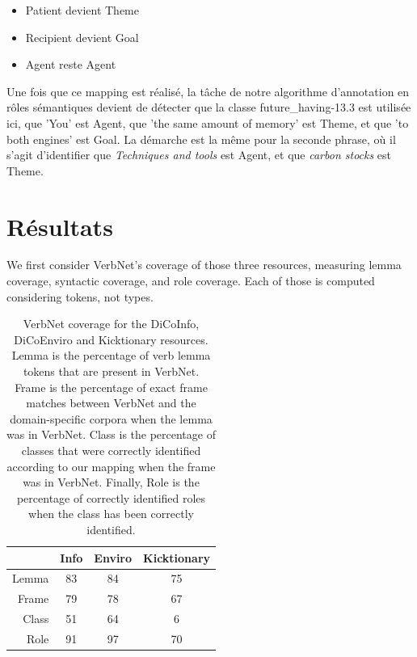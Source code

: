 \begin{itemize}
    \item Patient devient Theme
    \item Recipient devient Goal
    \item Agent reste Agent
\end{itemize}

Une fois que ce mapping est réalisé, la tâche de notre algorithme d'annotation
en rôles sémantiques devient de détecter que la classe future\_having-13.3 est
utilisée ici, que 'You' est Agent, que 'the same amount of memory' est Theme,
et que 'to both engines' est Goal. La démarche est la même pour la seconde
phrase, où il s'agit d'identifier que \textit{Techniques and tools} est Agent,
et que \textit{carbon stocks} est Theme.


\section{Résultats}
\label{sec:domainsrlresults}

We first consider VerbNet's coverage of those three resources, measuring lemma
coverage, syntactic coverage, and role coverage. Each of those is computed
considering tokens, not types.

\begin{table}[h]
\centering
\begin{tabular}{rccc}
  \toprule
        & Info & Enviro & Kicktionary \\
  \midrule
  Lemma & 83 & 84 & 75 \\
  Frame & 79 & 78 & 67 \\
  Class & 51 & 64 & 6  \\
  Role  & 91 & 97 & 70 \\
  \bottomrule
\end{tabular}

\caption{\protect\label{table:coverage} VerbNet coverage for the DiCoInfo,
DiCoEnviro and Kicktionary resources. Lemma is the percentage of verb lemma
tokens that are present in VerbNet. Frame is the percentage of exact frame
matches between VerbNet and the domain-specific corpora when the lemma was in
VerbNet. Class is the percentage of classes that were correctly identified
according to our mapping when the frame was in VerbNet. Finally, Role is the
percentage of correctly identified roles when the class has been correctly
identified.}

\end{table}

